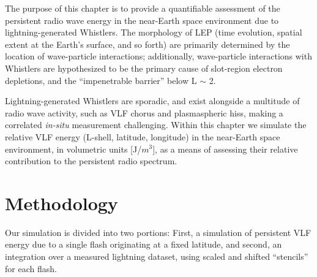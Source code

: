 The purpose of this chapter is to provide a quantifiable assessment of the persistent radio wave energy in the near-Earth space environment due to lightning-generated Whistlers. The morphology of LEP (time evolution, spatial extent at the Earth's surface, and so forth) are primarily determined by the location of wave-particle interactions; additionally, wave-particle interactions with Whistlers are hypothesized to be the primary cause of slot-region electron depletions, and the ``impenetrable barrier'' below L $\sim$ 2.

Lightning-generated Whistlers are sporadic, and exist alongside a multitude of radio wave activity, such as VLF chorus and plasmaspheric hiss, making a correlated \emph{in-situ} measurement challenging. Within this chapter we simulate the relative VLF energy (L-shell, latitude, longitude) in the near-Earth space environment, in volumetric units [J/$m^3$], as a means of assessing their relative contribution to the persistent radio spectrum.


\section{Methodology}
Our simulation is divided into two portions: First, a simulation of persistent VLF energy due to a single flash originating at a fixed latitude, and second, an integration over a measured lightning dataset, using scaled and shifted ``stencils'' for each flash.

